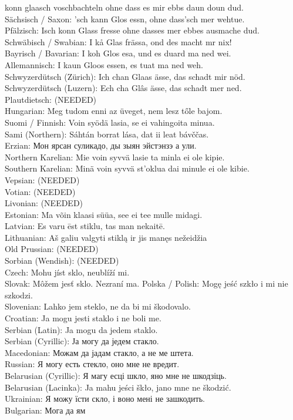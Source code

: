 \documentclass{report}
\begin{document}
konn glaasch voschbachteln ohne dass es mir ebbs daun doun dud.\\{} Sächsisch / Saxon: 'sch kann Glos essn, ohne dass'sch mer wehtue.\\{} Pfälzisch: Isch konn Glass fresse ohne dasses mer ebbes ausmache dud.\\{} Schwäbisch / Swabian: I kå Glas frässa, ond des macht mr nix!\\{} Bayrisch / Bavarian: I koh Glos esa, und es duard ma ned wei.\\{} Allemannisch: I kaun Gloos essen, es tuat ma ned weh.\\{} Schwyzerdütsch (Zürich): Ich chan Glaas ässe, das schadt mir nöd.\\{} Schwyzerdütsch (Luzern): Ech cha Glâs ässe, das schadt mer ned.\\{} Plautdietsch: (NEEDED)\\{} Hungarian: Meg tudom enni az üveget, nem lesz tőle bajom.\\{} Suomi / Finnish: Voin syödä lasia, se ei vahingoita minua.\\{} Sami (Northern): Sáhtán borrat lása, dat ii leat bávččas.\\{} Erzian: Мон ярсан суликадо, ды зыян эйстэнзэ а ули.\\{} Northern Karelian: Mie voin syvvä lasie ta minla ei ole kipie.\\{} Southern Karelian: Minä voin syvvä st'oklua dai minule ei ole kibie.\\{} Vepsian: (NEEDED)\\{} Votian: (NEEDED)\\{} Livonian: (NEEDED)\\{} Estonian: Ma võin klaasi süüa, see ei tee mulle midagi.\\{} Latvian: Es varu ēst stiklu, tas man nekaitē.\\{} Lithuanian: Aš galiu valgyti stiklą ir jis manęs nežeidžia\\{} Old Prussian: (NEEDED)\\{} Sorbian (Wendish): (NEEDED)\\{} Czech: Mohu jíst sklo, neublíží mi.\\{} Slovak: Môžem jesť sklo. Nezraní ma. Polska / Polish: Mogę jeść szkło i mi nie szkodzi.\\{} Slovenian: Lahko jem steklo, ne da bi mi škodovalo.\\{} Croatian: Ja mogu jesti staklo i ne boli me.\\{} Serbian (Latin): Ja mogu da jedem staklo.\\{} Serbian (Cyrillic): Ја могу да једем стакло.\\{} Macedonian: Можам да јадам стакло, а не ме штета.\\{} Russian: Я могу есть стекло, оно мне не вредит.\\{} Belarusian (Cyrillic): Я магу есці шкло, яно мне не шкодзіць.\\{} Belarusian (Lacinka): Ja mahu jeści škło, jano mne ne škodzić.\\{} Ukrainian: Я можу їсти скло, і воно мені не зашкодить.\\{} Bulgarian: Мога да ям 
\end{document}
